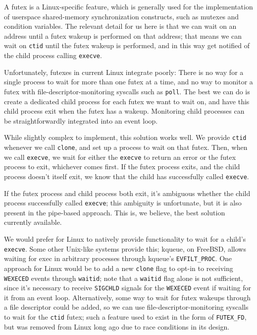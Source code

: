 \documentclass[sigplan]{acmart}
\begin{document}
A futex is a Linux-specific feature,
which is generally used for the implementation of userspace shared-memory synchronization constructs,
such as mutexes and condition variables.
The relevant detail for us here is that we can wait on an address
until a futex wakeup is performed on that address;
that means we can wait on \texttt{ctid} until the futex wakeup is performed,
and in this way get notified of the child process calling \texttt{execve}.

Unfortunately, futexes in current Linux integrate poorly:
There is no way for a single process to wait for more than one futex at a time,
and no way to monitor a futex with file-descriptor-monitoring syscalls such as \texttt{poll}.
The best we can do is create a dedicated child process for each futex we want to wait on,
and have this child process exit when the futex has a wakeup.
Monitoring child processes can be straightforwardly integrated into an event loop.

While slightly complex to implement, this solution works well.
We provide \texttt{ctid} whenever we call \texttt{clone},
and set up a process to wait on that futex.
Then, when we call \texttt{execve},
we wait for either the \texttt{execve} to return an error or the futex process to exit,
whichever comes first.
If the futex process exits,
and the child process doesn't itself exit,
we know that the child has successfully called \texttt{execve}.

If the futex process and child process both exit,
it's ambiguous whether the child process successfully called \texttt{execve};
this ambiguity is unfortunate, but it is also present in the pipe-based approach.
This is, we believe, the best solution currently available.

We would prefer for Linux to natively provide functionality to wait for a child's \texttt{execve}.
Some other Unix-like systems provide this;
kqueue, on FreeBSD, allows waiting for exec in arbitrary processes through kqueue's \verb|EVFILT_PROC|.
One approach for Linux would be to add a new \texttt{clone} flag to opt-in to receiving \texttt{WEXECED} events through \texttt{waitid};
note that a \texttt{waitid} flag alone is not sufficient,
since it's necessary to receive \texttt{SIGCHLD} signals for the \texttt{WEXECED} event if waiting for it from an event loop.
Alternatively, some way to wait for futex wakeups through a file descriptor could be added,
so we can use file-descriptor-monitoring syscalls to wait for the \texttt{ctid} futex;
such a feature used to exist in the form of \verb|FUTEX_FD|,
but was removed from Linux long ago due to race conditions in its design.
\end{document}

